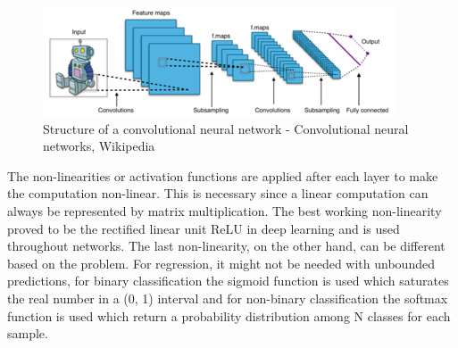 \documentclass[a4paper,12pt]{article}
\begin{document}
\vspace{4mm}

\begin{figure}[H]
    \centering
    \includegraphics[width=.8\linewidth]{wiki_cnn.png}
    \caption{Structure of a convolutional neural network - Convolutional neural networks, Wikipedia}
    \label{fig:my_label}
\end{figure}

\vspace{4mm}

\par The non-linearities or activation functions are applied after each layer to make the computation non-linear. This is necessary since a linear computation can always be represented by matrix multiplication. The best working non-linearity proved to be the rectified linear unit ReLU in deep learning and is used throughout networks. The last non-linearity, on the other hand, can be different based on the problem. For regression, it might not be needed with unbounded predictions, for binary classification the sigmoid function is used which saturates the real number in a (0, 1) interval and for non-binary classification the softmax function is used which return a probability distribution among N classes for each sample.

\vspace{4mm}
\end{document}

